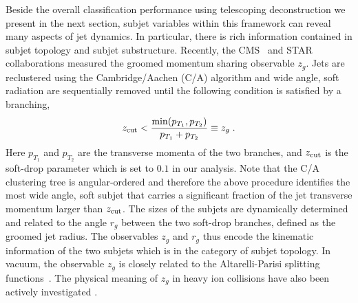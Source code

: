 \documentclass[notoc,preprintnumbers]{JHEP3}
\begin{document}
Beside the overall classification performance using telescoping deconstruction we present in the next section, subjet variables within this framework can reveal many aspects of jet dynamics. In particular, there is rich information contained in subjet topology and subjet substructure. Recently, the CMS~\cite{Sirunyan:2017bsd} and STAR~\cite{Kauder:2017mhg} collaborations measured the groomed momentum sharing observable $z_g$. Jets are reclustered using the Cambridge/Aachen (C/A) algorithm \cite{Dokshitzer:1997in,Wobisch:1998wt} and wide angle, soft radiation are sequentially removed until the following condition is satisfied by a branching,
\begin{equation}
    z_{\rm cut} < \frac{\min(p_{T_1},p_{T_2})}{p_{T_1}+p_{T_2}} \equiv z_g\;.
\label{SD}
\end{equation}
Here $p_{T_1}$ and $p_{T_2}$ are the transverse momenta of the two branches, and $z_{\rm cut}$ is the soft-drop parameter which is set to $0.1$ in our analysis. Note that the C/A clustering tree is angular-ordered and therefore the above procedure identifies the most wide angle, soft subjet that carries a significant fraction of the jet transverse momentum larger than $z_{\rm cut}$. The sizes of the subjets are dynamically determined and related to the angle $r_g$ between the two soft-drop branches, defined as the groomed jet radius. The observables $z_g$ and $r_g$ thus encode the kinematic information of the two subjets which is in the category of subjet topology. In vacuum, the observable $z_g$ is closely related to the Altarelli-Parisi splitting functions~\cite{Altarelli:1977zs}. The physical meaning of $z_g$ in heavy ion collisions have also been actively investigated \cite{Chien:2016led,Mehtar-Tani:2016aco,Milhano:2017nzm,Chang:2017gkt,Li:2017wwc}.
\end{document}
